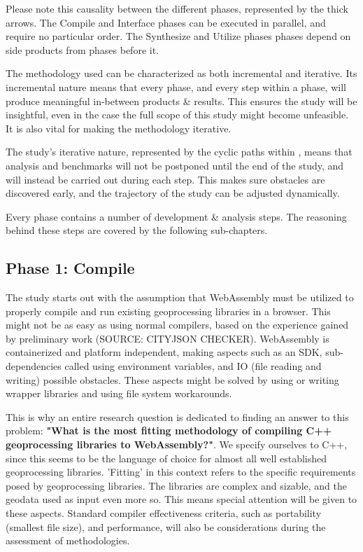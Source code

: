 Please note this causality between the different phases, represented by the thick arrows. The Compile and Interface phases can be executed in parallel, and require no particular order. The Synthesize and Utilize phases phases depend on side products from phases before it. 

The methodology used can be characterized as both incremental and iterative. Its incremental nature means that every phase, and every step within a phase, will produce meaningful in-between products \& results. This ensures the study will be insightful, even in the case the full scope of this study might become unfeasible. It is also vital for making the methodology iterative. 

The study's iterative nature, represented by the cyclic paths within , means that analysis and benchmarks will not be postponed until the end of the study, and will instead be carried out during each step. This makes sure obstacles are discovered early, and the trajectory of the study can be adjusted dynamically.  

Every phase contains a number of development \& analysis steps. The reasoning behind these steps are covered by the following sub-chapters.  


\subsection{Phase 1: Compile}

The study starts out with the assumption that WebAssembly must be utilized to properly compile and run existing geoprocessing libraries in a browser. This might not be as easy as using normal compilers, based on the experience gained by preliminary work (SOURCE: CITYJSON CHECKER). WebAssembly is containerized and platform independent, making aspects such as an SDK, sub-dependencies called using environment variables, and IO (file reading and writing) possible obstacles. These aspects might be solved by using or writing wrapper libraries and using file system workarounds. 

This is why an entire research question is dedicated to finding an answer to this problem: \textbf{"What is the most fitting methodology of compiling C++ geoprocessing libraries to WebAssembly?"}.
We specify ourselves to C++, since this seems to be the language of choice for almost all well established geoprocessing libraries. 'Fitting' in this context refers to the specific requirements posed by geoprocessing libraries. The libraries are complex and sizable, and the geodata used as input even more so. This means special attention will be given to these aspects. Standard compiler effectiveness criteria, such as portability (smallest file size), and performance, will also be considerations during the assessment of methodologies.  

